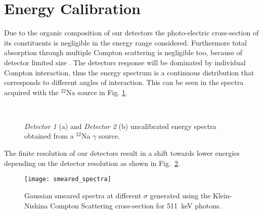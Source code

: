 
\section*{Energy Calibration}

Due to the organic composition of our detectors the photo-electric cross-section of its constituents is negligible in the energy range considered. Furthermore total absorption through multiple Compton scattering is negligible too, because of detector limited size . The detectors response will be dominated by individual Compton interaction, thus the energy spectrum is a continuous distribution that corresponds to different angles of interaction. This can be seen in the spectra acquired with the $^{22}$Na source in Fig. \ref{fig: uncalibrated energy spectra}.

\smallskip
\begin{figure}[h!]
\centering
{} \quad
{} \\
\caption{\emph{Detector 1} (a) and \emph{Detector 2} (b) uncalibrated energy spectra  obtained from a $^{22}$Na $\gamma$ source.}
\label{fig: uncalibrated energy spectra}
\end{figure}

The finite resolution of our detectors result in a shift towards lower energies depending on the detector resolution as shown in Fig.~\ref{fig: smeared spectra}.
\begin{figure}[h!]
\centering
\texttt{[image: smeared\_spectra]}
\caption{Gaussian smeared spectra at different $\sigma$ generated using the  Klein-Nishina Compton Scattering cross-section  for 511~keV photons.}
\label{fig: smeared spectra}
\end{figure}

